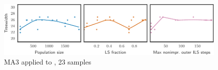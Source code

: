 \begin{figure}[h]\strictpagecheck\centering

\includegraphics[scale=0.85]{plots/MA3-correlation-regplots-miles500-0-crop.pdf}


\caption[Parameter influence for MA3 when applied to ]{\gls{MA3} applied to , 23 samples}

\label{MA3-correlation-regplots-miles500}

\end{figure}
